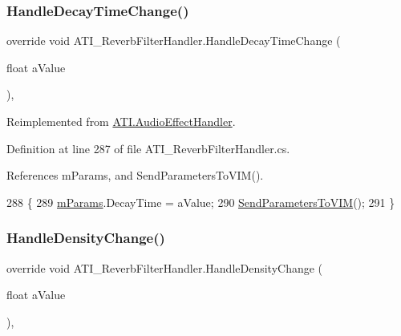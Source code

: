 \subsubsection{\texorpdfstring{Handle\+Decay\+Time\+Change()}{HandleDecayTimeChange()}}
{\footnotesize\ttfamily override void A\+T\+I\+\_\+\+Reverb\+Filter\+Handler.\+Handle\+Decay\+Time\+Change (\begin{DoxyParamCaption}\item[{float}]{a\+Value }\end{DoxyParamCaption})\hspace{0.3cm}{\ttfamily [protected]}, {\ttfamily [virtual]}}



Reimplemented from \hyperlink{class_a_t_i_1_1_audio_effect_handler_a35173ee088bc2459907af3521bcd69ac}{A\+T\+I.\+Audio\+Effect\+Handler}.



Definition at line 287 of file A\+T\+I\+\_\+\+Reverb\+Filter\+Handler.\+cs.



References m\+Params, and Send\+Parameters\+To\+V\+I\+M().


\begin{DoxyCode}
288     \{
289         \hyperlink{class_a_t_i___reverb_filter_handler_a034260fbce2052b42bceddc891632347}{mParams}.DecayTime = aValue;
290         \hyperlink{class_a_t_i___reverb_filter_handler_aacb469dc3038fca616d638f6a5a04a30}{SendParametersToVIM}();
291     \}
\end{DoxyCode}
\mbox{\label{class_a_t_i___reverb_filter_handler_a4a95ee1076720663fbe84e624385e636}} 
\subsubsection{\texorpdfstring{Handle\+Density\+Change()}{HandleDensityChange()}}
{\footnotesize\ttfamily override void A\+T\+I\+\_\+\+Reverb\+Filter\+Handler.\+Handle\+Density\+Change (\begin{DoxyParamCaption}\item[{float}]{a\+Value }\end{DoxyParamCaption})\hspace{0.3cm}{\ttfamily [protected]}, {\ttfamily [virtual]}}



